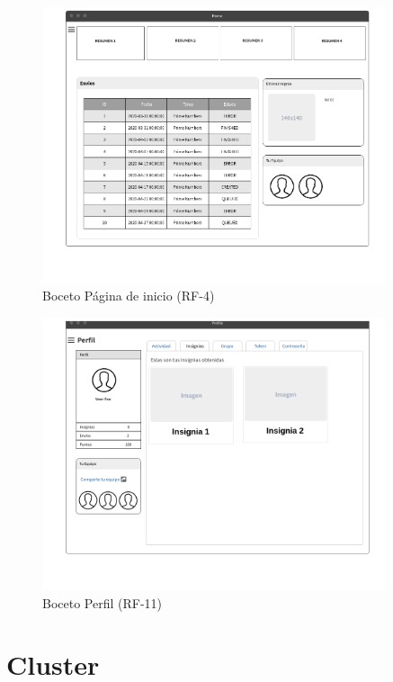 \documentclass[11pt,spanish,listoffigures,listoftables]{tfgetsinf}
\begin{document}
\begin{figure}[!ht]
	\centering
	\includegraphics[width=0.9\textwidth]{img/wireframe-dashboard}
	\caption[Boceto Página de inicio]{Boceto Página de inicio (RF-4)}
	\label{figura:wireframe-dashboard}
\end{figure}

\begin{figure}[!ht]
	\centering
	\includegraphics[width=0.9\textwidth]{img/wireframe-perfil}
	\caption[Boceto Perfil]{Boceto Perfil (RF-11)}
	\label{figura:wireframe-perfil}
\end{figure}

\FloatBarrier

\section{Cluster \kahan}
\end{document}
